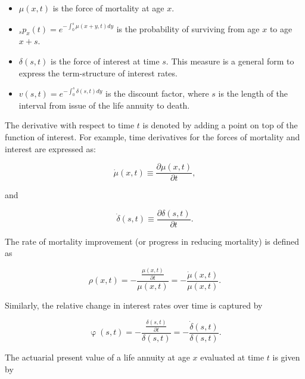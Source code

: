 \documentclass[12pt]{article}
\begin{document}
\begin{itemize}

\item
\(\mu(x,t)\) is the force of mortality at age \(x\).

\item
$_sp_x(t)=e^{-\int_{0}^{s}\mu(x+y,t)dy}$ is the probability of surviving from age \(x\) to age \(x+s\).


\item
\(\delta(s,t)\) is the force of interest at time $s$. This measure is a general form to express the term-structure of interest rates.

\item 

${v}(s,t)=e^{-\int_{0}^{s}\delta(s,t)dy}$ is the discount factor, where $s$ is the length of the interval from issue of the life annuity to death.

\end{itemize}

The derivative with respect to time $t$ is denoted by adding a point on top of the function of interest. For example, time derivatives for the forces of mortality and interest are expressed as:

\begin{equation} \label{eq:mudot}
\dot{\mu}(x,t)\equiv\frac{\partial\mu(x,t)}{\partial t},
\end{equation}

and 

\begin{equation} \label{eq:mudot}
\dot{\delta}(s,t)\equiv\frac{\partial\delta(s,t)}{\partial t}.
\end{equation}



The rate of mortality improvement (or progress in reducing mortality) is defined as


\begin{equation} \label{eq:rho}
\rho(x,t)=-\frac{\frac{\mu(x,t)}{\partial t}}{\mu(x,t)} = - \frac{\dot{\mu}(x,t)}{\mu(x,t)}.
\end{equation}

Similarly, the relative change in interest rates over time is captured by 


\begin{equation} \label{eq:phi}
\upvarphi(s,t)=-\frac{\frac{\delta(s,t)}{\partial t}}{\delta(s,t)} = -\frac{\dot{\delta}(s,t)}{\delta(s,t)}.
\end{equation}


The actuarial present value of a life annuity at age $x$ evaluated at time $t$ is given by
\end{document}
